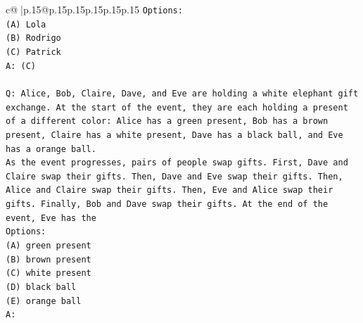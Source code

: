 \documentclass{article}
\begin{document}
{\begin{supertabular}{c@{$\;$}|p{.15\linewidth}@{}p{.15\linewidth}p{.15\linewidth}p{.15\linewidth}p{.15\linewidth}p{.15\linewidth}}
{{{\texttt{Options:} \\
\texttt{(A) Lola} \\
\texttt{(B) Rodrigo} \\
\texttt{(C) Patrick} \\
\texttt{A: (C)} \\
\\ 
\texttt{Q: Alice, Bob, Claire, Dave, and Eve are holding a white elephant gift exchange. At the start of the event, they are each holding a present of a different color: Alice has a green present, Bob has a brown present, Claire has a white present, Dave has a black ball, and Eve has a orange ball.} \\
\texttt{As the event progresses, pairs of people swap gifts. First, Dave and Claire swap their gifts. Then, Dave and Eve swap their gifts. Then, Alice and Claire swap their gifts. Then, Eve and Alice swap their gifts. Finally, Bob and Dave swap their gifts. At the end of the event, Eve has the} \\
\texttt{Options:} \\
\texttt{(A) green present} \\
\texttt{(B) brown present} \\
\texttt{(C) white present} \\
\texttt{(D) black ball} \\
\texttt{(E) orange ball} \\
\texttt{A:} \\
            }
        }
    }
     \\ \\


\end{supertabular}}
\end{document}
